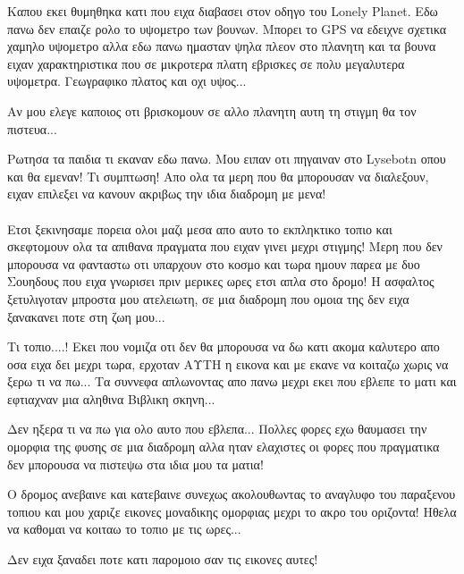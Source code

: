 Καπου εκει θυμηθηκα κατι που ειχα διαβασει στον οδηγο του Lonely Planet. Εδω πανω δεν επαιζε ρολο το υψομετρο των βουνων. Μπορει το GPS να εδειχνε σχετικα χαμηλο υψομετρο αλλα εδω πανω ημασταν ψηλα πλεον στο πλανητη και τα βουνα ειχαν χαρακτηριστικα που σε μικροτερα πλατη εβρισκες σε πολυ μεγαλυτερα υψομετρα. Γεωγραφικο πλατος και οχι υψος...

Αν μου ελεγε καποιος οτι βρισκομουν σε αλλο πλανητη αυτη τη στιγμη θα τον πιστευα...


Ρωτησα τα παιδια τι εκαναν εδω πανω. Μου ειπαν οτι πηγαιναν στο Lysebotn οπου και θα εμεναν! Τι συμπτωση! Απο ολα τα μερη που θα μπορουσαν να διαλεξουν, ειχαν επιλεξει να κανουν ακριβως την ιδια διαδρομη με μενα!\\

\\

Ετσι ξεκινησαμε πορεια ολοι μαζι μεσα απο αυτο το εκπληκτικο τοπιο και σκεφτομουν ολα τα απιθανα πραγματα που ειχαν γινει μεχρι στιγμης! Μερη που δεν μπορουσα να φανταστω οτι υπαρχουν στο κοσμο και τωρα ημουν παρεα με δυο Σουηδους που ειχα γνωρισει πριν μερικες ωρες ετσι απλα στο δρομο!
Η ασφαλτος ξετυλιγοταν μπροστα μου ατελειωτη, σε μια διαδρομη που ομοια της δεν ειχα ξανακανει ποτε στη ζωη μου...


Τι τοπιο....! Εκει που νομιζα οτι δεν θα μπορουσα να δω κατι ακομα καλυτερο απο οσα ειχα δει μεχρι τωρα, ερχοταν ΑΥΤΗ η εικονα και με εκανε να κοιταζω χωρις να ξερω τι να πω... Τα συννεφα απλωνοντας απο πανω μεχρι εκει που εβλεπε το ματι και εφτιαχναν μια αληθινα Βιβλικη σκηνη... 


Δεν ηξερα τι να πω για ολο αυτο που εβλεπα... Πολλες φορες εχω θαυμασει την ομορφια της φυσης σε μια διαδρομη αλλα ηταν ελαχιστες οι φορες που πραγματικα δεν μπορουσα να πιστεψω στα ιδια μου τα ματια! 

Ο δρομος ανεβαινε και κατεβαινε συνεχως ακολουθωντας το αναγλυφο του παραξενου τοπιου και μου χαριζε εικονες μοναδικης ομορφιας μεχρι το ακρο του οριζοντα! 
Ηθελα να καθομαι να κοιταω το τοπιο με τις ωρες...


Δεν ειχα ξαναδει ποτε κατι παρομοιο σαν τις εικονες αυτες! 


